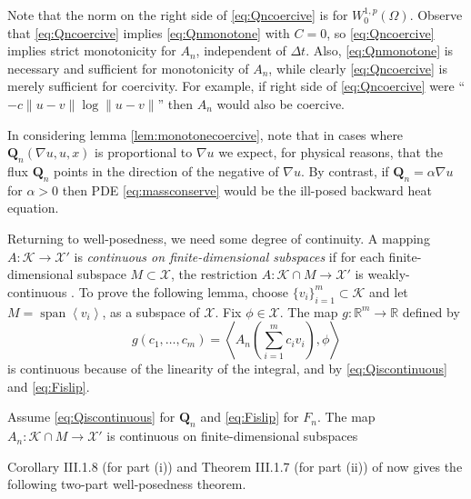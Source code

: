 \documentclass[final,leqno,onefignum,onetabnum]{siamltex1213bueler}
\newcommand\bQ{\mathbf{Q}}
\renewcommand{\grad}{\nabla}
\newcommand{\ip}[2]{\ensuremath{\left<#1,#2\right>}}
\newcommand\RR{\mathbb{R}}
\begin{document}
Note that the norm on the right side of \eqref{eq:Qncoercive} is for $W_0^{1,p}(\Omega)$.  Observe that \eqref{eq:Qncoercive} implies \eqref{eq:Qnmonotone} with $C=0$, so \eqref{eq:Qncoercive} implies strict monotonicity for $A_n$, independent of $\Delta t$.  Also, \eqref{eq:Qnmonotone} is necessary and sufficient for monotonicity of $A_n$, while clearly \eqref{eq:Qncoercive} is merely sufficient for coercivity.  For example, if right side of \eqref{eq:Qncoercive} were ``$- c \|u-v\| \log \|u-v\|$'' then $A_n$ would also be coercive.

In considering lemma \ref{lem:monotonecoercive}, note that in cases where $\bQ_n(\grad u,u,x)$ is proportional to $\grad u$ we expect, for physical reasons, that the flux $\bQ_n$ points in the direction of the negative of $\grad u$.  By contrast, if $\bQ_n = \alpha \grad u$ for $\alpha>0$ then PDE \eqref{eq:massconserve} would be the ill-posed backward heat equation.

Returning to well-posedness, we need some degree of continuity.  A mapping $A : \mathcal{K} \to \mathcal{X}'$ is \emph{continuous on finite-dimensional subspaces} if for each finite-dimensional subspace $M\subset \mathcal{X}$, the restriction $A : \mathcal{K}\cap M \to \mathcal{X}'$ is weakly-continuous \cite{KinderlehrerStampacchia}.  To prove the following lemma, choose $\{v_i\}_{i=1}^m \subset \mathcal{K}$ and let $M=\operatorname{span}\left<v_i\right>$, as a subspace of $\mathcal{X}$.  Fix $\phi\in\mathcal{X}$.  The map $g:\RR^m \to \RR$ defined by
\begin{equation}
  g(c_1,\dots,c_m) = \ip{A_n\left(\sum_{i=1}^m c_i v_i\right)}{\phi}
\end{equation}
is continuous because of the linearity of the integral, and by \eqref{eq:Qiscontinuous} and \eqref{eq:Fislip}.

\medskip
\begin{lemma}  \label{lem:continuous}  Assume \eqref{eq:Qiscontinuous} for $\bQ_n$ and \eqref{eq:Fislip} for $F_n$.  The map $A_n : \mathcal{K}\cap M \to \mathcal{X}'$ is continuous on finite-dimensional subspaces
\end{lemma}

\medskip
Corollary III.1.8 (for part (i)) and Theorem III.1.7 (for part (ii)) of \cite{KinderlehrerStampacchia} now gives the following two-part well-posedness theorem.
\end{document}

